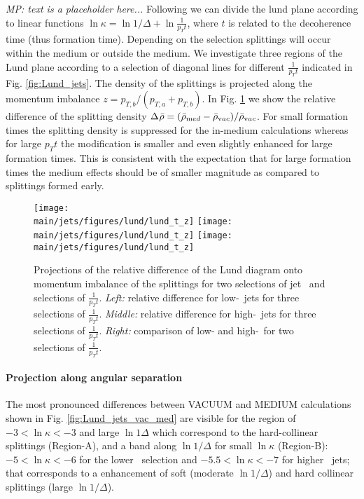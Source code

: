 {\it MP: text is a placeholder here...}
Following \cite{Andrews:2018jcm} we can divide the lund plane according to linear functions $\ln\kappa = \ln1/\Delta + \ln \frac{1}{p_{T} t}$, where $t$ is related to the decoherence time (thus formation time).
Depending on the selection splittings will occur within the medium or outside the medium.
We investigate three regions of the Lund plane according to a selection of diagonal lines for different $\frac{1}{p_{T} t}$ indicated in Fig. \ref{fig:Lund_jets}.
The density of the splittings is projected along the momentum imbalance $z = p_{T,b}/(p_{T,a} + p_{T,b})$.
In Fig. \ref{fig:Lund_projections_z} we show the relative difference of the splitting density $\Delta_{\rm}\bar{\rho} = (\bar{\rho}_{\mathrm med} - \bar{\rho}_{\mathrm vac})/\bar{\rho}_{\mathrm vac}$.
For small formation times the splitting density is suppressed for the in-medium calculations whereas for large $p_{T} t$ the modification is smaller and even slightly enhanced for large formation times.
This is consistent with the expectation that for large formation times the medium effects should be of smaller magnitude as compared to splittings formed early.



\begin{figure}[htbp]
	\centering
	\texttt{[image: \\main/jets/figures/lund/lund\_t\_z]}
	\texttt{[image: \\main/jets/figures/lund/lund\_t\_z]}
	\texttt{[image: \\main/jets/figures/lund/lund\_t\_z]}
	\caption{Projections of the relative difference of the Lund diagram onto momentum imbalance of the splittings for two selections of jet \pt\ and selections of $\frac{1}{p_{T} t}$.
	{\it Left:} relative difference for low-\pt\ jets for three selections of $\frac{1}{p_{T} t}$.
	{\it Middle:} relative difference for high-\pt\ jets for three selections of $\frac{1}{p_{T} t}$.
	{\it Right:} comparison of low- and high-\pt\ for two selections of $\frac{1}{p_{T} t}$.
	}
	\label{fig:Lund_projections_z}
\end{figure}

\paragraph{Projection along angular separation}
The most pronounced differences between VACUUM and MEDIUM calculations shown in Fig. \ref{fig:Lund_jets_vac_med} are visible for the region of $-3 < \ln \kappa < -3$ and large $\ln 1\Delta$ which correspond to the hard-collinear splittings (Region-A), and a band along $\ln 1/\Delta$ for small $\ln \kappa$ (Region-B): $-5 < \ln \kappa < -6$ for the lower \pt\ selection and $-5.5 < \ln \kappa < -7$ for higher \pt\ jets; that corresponds to a enhancement of soft (moderate $\ln 1/\Delta$) and hard collinear splittings (large $\ln 1/\Delta$).

